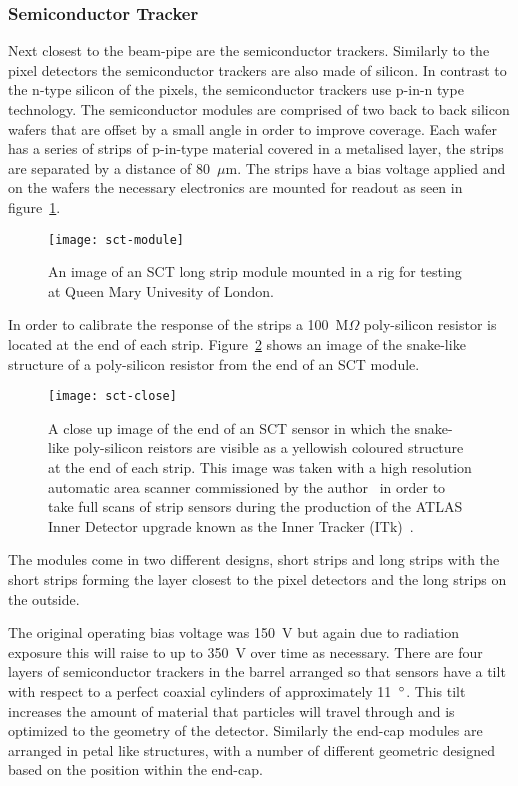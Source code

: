 \subsubsection{Semiconductor Tracker}

Next closest to the beam-pipe are the semiconductor trackers. Similarly to the pixel
detectors the semiconductor trackers are also made of silicon. In contrast to
the n-type silicon of the pixels, the semiconductor trackers use p-in-n type
technology. The semiconductor modules are comprised of two back to back silicon
wafers that are offset by a small angle in order to improve coverage. Each wafer
has a series of strips of p-in-type material covered in a metalised layer, the
strips are separated by a distance of 80~$\mu$m. The strips have a bias voltage
applied and on the wafers the necessary electronics are mounted for readout as
seen in figure~\ref{fig:strip-module}.
\begin{figure}[h]
  \centering
  \texttt{[image: sct-module]}
  \caption[ATLAS long strip module]{An image of an SCT long strip module
    mounted in a rig for testing at Queen Mary Univesity of London.}
  \label{fig:strip-module}
\end{figure}
In order to calibrate the response of the strips a 100~M$\Omega$ poly-silicon
resistor is located at the end of each strip. Figure~\ref{fig:sct-close} shows an
image of the snake-like structure of a poly-silicon resistor from the end of an
SCT module.
\begin{figure}[h]
  \centering
  \texttt{[image: sct-close]}
  \caption[ATLAS strip close-up]{A close up image of the end of an SCT sensor in
    which the snake-like poly-silicon reistors are visible as a yellowish
    coloured structure at the end of each strip. This image was taken with a
    high resolution automatic area scanner commissioned by the
    author~\cite{itk-scanner} in order to take full scans of strip sensors
    during the production of the ATLAS Inner Detector upgrade known as the Inner
    Tracker (ITk)~\cite{itk-tdr, itk-strips-tdr}.}
  \label{fig:sct-close}
\end{figure}
The modules come in two different designs, short strips and long
strips with the short strips forming the layer closest to the pixel detectors
and the long strips on the outside.

The original operating bias voltage was 150~V but again due to radiation
exposure this will raise to up to 350~V over time as necessary. There are four
layers of semiconductor trackers in the barrel arranged so that sensors have a
tilt with respect to a perfect coaxial cylinders of approximately 11~$\degree$.
This tilt increases the amount of material that particles will travel through
and is optimized to the geometry of the detector. Similarly the end-cap modules
are arranged in petal like structures, with a number of different geometric
designed based on the position within the end-cap.

